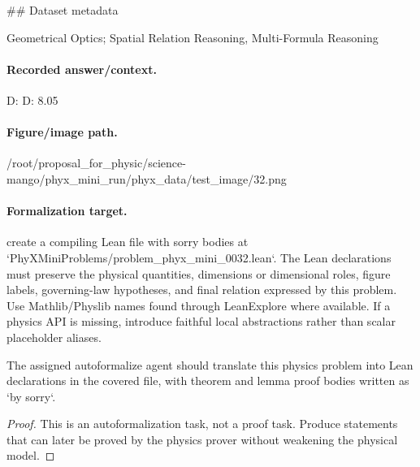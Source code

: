 \#\# Dataset metadata

Geometrical Optics; Spatial Relation Reasoning, Multi-Formula Reasoning

\paragraph{Recorded answer/context.}
D: D: 8.05

\paragraph{Figure/image path.}
/root/proposal\_for\_physic/science-mango/phyx\_mini\_run/phyx\_data/test\_image/32.png

\paragraph{Formalization target.}
create a compiling Lean file with sorry bodies at `PhyXMiniProblems/problem\_phyx\_mini\_0032.lean`. The Lean declarations must preserve the physical quantities, dimensions or dimensional roles, figure labels, governing-law hypotheses, and final relation expressed by this problem.
Use Mathlib/Physlib names found through LeanExplore where available. If a physics API is missing, introduce faithful local abstractions rather than scalar placeholder aliases.

\begin{theorem}
\label{thm:physics:phyx_mini_0032:target}
The assigned autoformalize agent should translate this physics problem into Lean declarations in the covered file, with theorem and lemma proof bodies written as `by sorry`.
\end{theorem}
\begin{proof}
This is an autoformalization task, not a proof task. Produce statements that can later be proved by the physics prover without weakening the physical model.
\end{proof}

